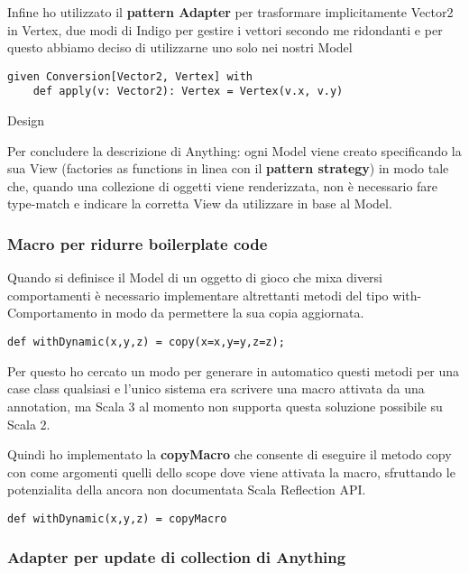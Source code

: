 Infine ho utilizzato il \textbf{pattern Adapter} per trasformare implicitamente Vector2 in Vertex, due modi di Indigo per gestire i vettori secondo me ridondanti e per questo abbiamo deciso di utilizzarne uno solo nei nostri Model
\begin{lstlisting}[basicstyle=\tiny]
given Conversion[Vector2, Vertex] with
    def apply(v: Vector2): Vertex = Vertex(v.x, v.y)
\end{lstlisting}

Design

Per concludere la descrizione di Anything: ogni Model viene creato specificando la sua View (factories as functions in linea con il \textbf{pattern strategy}) in modo tale che, quando una collezione di oggetti viene renderizzata, non è necessario fare type-match e indicare la corretta View da utilizzare in base al Model.


\subsubsection{Macro per ridurre boilerplate code}
Quando si definisce il Model di un oggetto di gioco che mixa diversi comportamenti è necessario implementare altrettanti metodi del tipo with-Comportamento in modo da permettere la sua copia aggiornata. 

\begin{lstlisting}[basicstyle=\tiny]
def withDynamic(x,y,z) = copy(x=x,y=y,z=z); 
\end{lstlisting}

Per questo ho cercato un modo per generare in automatico questi metodi per una case class qualsiasi e l'unico sistema era scrivere una macro attivata da una annotation, ma Scala 3 al momento non supporta questa soluzione possibile su Scala 2.

Quindi ho implementato la \textbf{copyMacro} che consente di eseguire il metodo copy con come argomenti quelli dello scope dove viene attivata la macro, sfruttando le potenzialita della ancora non documentata Scala Reflection API. 

\begin{lstlisting}[basicstyle=\tiny]
def withDynamic(x,y,z) = copyMacro
\end{lstlisting}

\subsubsection{Adapter per update di collection di Anything}

